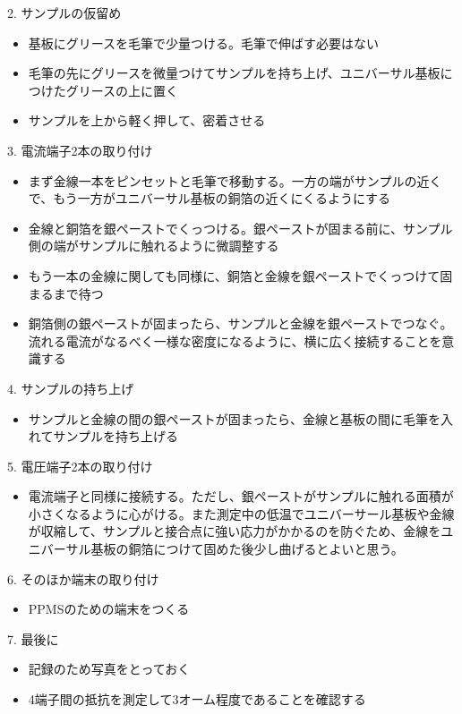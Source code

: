 \documentclass[11pt,a4paper]{jsarticle}
\begin{document}
2. サンプルの仮留め
\begin{itemize}
\item 基板にグリースを毛筆で少量つける。毛筆で伸ばす必要はない
\item 毛筆の先にグリースを微量つけてサンプルを持ち上げ、ユニバーサル基板につけたグリースの上に置く
\item サンプルを上から軽く押して、密着させる
\end{itemize}
 
3. 電流端子2本の取り付け
\begin{itemize}
\item まず金線一本をピンセットと毛筆で移動する。一方の端がサンプルの近くで、もう一方がユニバーサル基板の銅箔の近くにくるようにする
\item 金線と銅箔を銀ペーストでくっつける。銀ペーストが固まる前に、サンプル側の端がサンプルに触れるように微調整する
\item もう一本の金線に関しても同様に、銅箔と金線を銀ペーストでくっつけて固まるまで待つ
\item 銅箔側の銀ペーストが固まったら、サンプルと金線を銀ペーストでつなぐ。流れる電流がなるべく一様な密度になるように、横に広く接続することを意識する
 \end{itemize}
 
4. サンプルの持ち上げ
\begin{itemize}
\item サンプルと金線の間の銀ペーストが固まったら、金線と基板の間に毛筆を入れてサンプルを持ち上げる
 \end{itemize}
 
5. 電圧端子2本の取り付け
\begin{itemize}
\item 電流端子と同様に接続する。ただし、銀ペーストがサンプルに触れる面積が小さくなるように心がける。また測定中の低温でユニバーサール基板や金線が収縮して、サンプルと接合点に強い応力がかかるのを防ぐため、金線をユニバーサル基板の銅箔につけて固めた後少し曲げるとよいと思う。
 \end{itemize}
 
6. そのほか端末の取り付け
\begin{itemize}
\item PPMSのための端末をつくる
\end{itemize}

7. 最後に
\begin{itemize}
\item 記録のため写真をとっておく
\item 4端子間の抵抗を測定して3オーム程度であることを確認する
\end{itemize}
 
\end{document}
